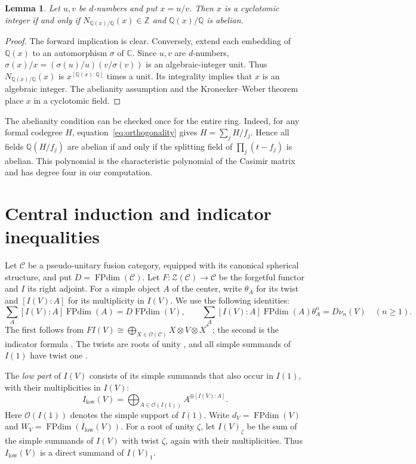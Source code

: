 \documentclass[11pt]{amsart}
\newtheorem{lemma}[theorem]{Lemma}
\theoremstyle{definition}
\DeclareMathOperator{\FPdim}{FPdim}
\newcommand{\C}{\mathbb C}
\newcommand{\Q}{\mathbb Q}
\newcommand{\Z}{\mathbb Z}
\numberwithin{equation}{section}
\begin{document}
\begin{lemma}\label{lem:codegree-ratio}
Let $u,v$ be $d$-numbers and put $x=u/v$. Then $x$ is a cyclotomic
integer if and only if $N_{\Q(x)/\Q}(x)\in\Z$ and $\Q(x)/\Q$ is abelian.
\end{lemma}
\begin{proof}
The forward implication is clear. Conversely, extend each embedding of
$\Q(x)$ to an automorphism $\sigma$ of $\C$. Since $u,v$ are $d$-numbers,
$\sigma(x)/x=(\sigma(u)/u)(v/\sigma(v))$ is an algebraic-integer unit.
Thus $N_{\Q(x)/\Q}(x)$ is $x^{[\Q(x):\Q]}$ times a unit. Its integrality
implies that $x$ is an algebraic integer. The abelianity assumption and
the Kronecker--Weber theorem place $x$ in a cyclotomic field.
\end{proof}

The abelianity condition can be checked once for the entire ring.
Indeed, for any formal codegree $H$, equation~\eqref{eq:orthogonality}
gives $H=\sum_jH/f_j$. Hence all fields $\Q(H/f_j)$ are abelian
if and only if the splitting field of $\prod_j(t-f_j)$ is abelian.
This polynomial is the characteristic polynomial of the Casimir matrix
and has degree four in our computation.

\section{Central induction and indicator inequalities}\label{sec:central}
Let $\mathcal C$ be a pseudo-unitary fusion category, equipped with its
canonical spherical structure, and put $D=\FPdim(\mathcal C)$.
Let $F:\mathcal Z(\mathcal C)\to\mathcal C$ be the forgetful functor
and $I$ its right adjoint. For a simple object $A$ of the center, write
$\theta_A$ for its twist and $[I(V):A]$ for its multiplicity in $I(V)$.
We use the following identities:
\[
 \sum_A[I(V):A]\FPdim(A)=D\FPdim(V),\qquad
 \sum_A[I(V):A]\FPdim(A)\theta_A^n=D\nu_n(V)\quad(n\geq1).
\]
The first follows from
$FI(V)\cong\bigoplus_{X\in\mathcal O(\mathcal C)}X\otimes V\otimes X^*$
\cite[Proposition~2.4]{OstrikRank3}; the second is the indicator formula
\cite[Theorem~4.1]{NgSchauenburg}. The twists are roots of unity
\cite[Theorem~5.5]{NgSchauenburg}, and all simple summands of $I(1)$
have twist one \cite[Theorem~2.5]{OstrikRank3}.

The \emph{low part} of $I(V)$ consists of its simple summands that also
occur in $I(1)$, with their multiplicities in $I(V)$:
\[
 I_{\mathrm{low}}(V)
 =\bigoplus_{A\in\mathcal O(I(1))}A^{\oplus[I(V):A]}.
\]
Here $\mathcal O(I(1))$ denotes the simple support of $I(1)$.
Write $d_V=\FPdim(V)$ and $W_V=\FPdim(I_{\mathrm{low}}(V))$.
For a root of unity $\zeta$, let $I(V)_\zeta$ be the sum of the simple
summands of $I(V)$ with twist $\zeta$, again with their multiplicities.
Thus $I_{\mathrm{low}}(V)$ is a direct summand of $I(V)_1$.
\end{document}
